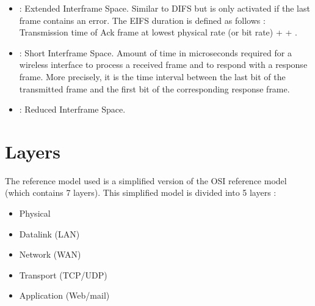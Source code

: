 \begin{itemize}
\item {} : Extended Interframe Space. Similar to DIFS but is only activated if the last frame contains an error. The EIFS duration is defined as follows : Transmission time of Ack frame at lowest physical rate (or bit rate) +  + .
\item {} : Short Interframe Space. Amount of time in microseconds required for a wireless interface to process a received frame and to respond with a response frame. More precisely, it is the time interval between the last bit of the transmitted frame and the first bit of the corresponding response frame.
\item {} : Reduced Interframe Space.
\end{itemize}

\chapter{Layers}

The reference model used is a simplified version of the OSI reference model (which contains 7 layers). This simplified model is divided into 5 layers :
\begin{itemize}
\item Physical
\item Datalink (LAN)
\item Network (WAN)
\item Transport (TCP/UDP)
\item Application (Web/mail)
\end{itemize}

